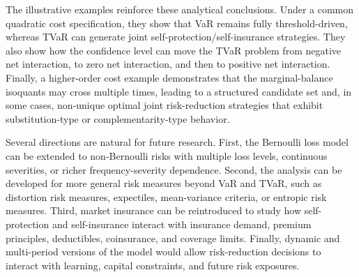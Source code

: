 \documentclass[a4paper,12pt]{article}
\begin{document}
The illustrative examples reinforce these analytical conclusions. Under a common quadratic cost specification, they show that VaR remains fully threshold-driven, whereas TVaR can generate joint self-protection/self-insurance strategies. They also show how the confidence level can move the TVaR problem from negative net interaction, to zero net interaction, and then to positive net interaction. Finally, a higher-order cost example demonstrates that the marginal-balance isoquants may cross multiple times, leading to a structured candidate set and, in some cases, non-unique optimal joint risk-reduction strategies that exhibit substitution-type or complementarity-type behavior.

Several directions are natural for future research. First, the Bernoulli loss model can be extended to non-Bernoulli risks with multiple loss levels, continuous severities, or richer frequency-severity dependence. Second, the analysis can be developed for more general risk measures beyond VaR and TVaR, such as distortion risk measures, expectiles, mean-variance criteria, or entropic risk measures. Third, market insurance can be reintroduced to study how self-protection and self-insurance interact with insurance demand, premium principles, deductibles, coinsurance, and coverage limits. Finally, dynamic and multi-period versions of the model would allow risk-reduction decisions to interact with learning, capital constraints, and future risk exposures.



\end{document}
